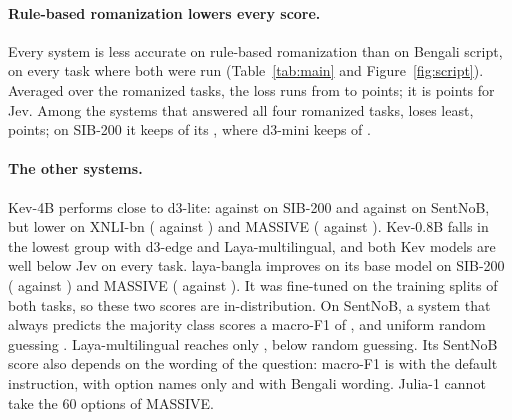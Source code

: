 \documentclass[11pt]{article}
\begin{document}
\paragraph{Rule-based romanization lowers every score.}
Every system is less accurate on rule-based romanization than on Bengali script, on every task where both were run (Table~\ref{tab:main} and Figure~\ref{fig:script}).
Averaged over the romanized tasks, the loss runs from \dropMinVal{} to \dropMaxVal{} points; it is \dropjev{} points for Jev.
Among the systems that answered all four romanized tasks, \dropBestName{} loses least, \dropBestVal{} points; on SIB-200 it keeps \accgemmaSibRom{} of its \accgemmaSibNat, where d3-mini keeps \accminiSibRom{} of \accminiSibNat.

\paragraph{The other systems.}
Kev-4B performs close to d3-lite: \acckevmdSibNat{} against \accliteSibNat{} on SIB-200 and \acckevmdSentNat{} against \accliteSentNat{} on SentNoB, but lower on XNLI-bn (\acckevmdXnliNat{} against \accliteXnliNat) and MASSIVE (\acckevmdMasNat{} against \accliteMasNat).
Kev-0.8B falls in the lowest group with d3-edge and Laya-multilingual, and both Kev models are well below Jev on every task.
laya-bangla improves on its base model on SIB-200 (\acclayabnSibNat{} against \acclayamlSibNat) and MASSIVE (\acclayabnMasNat{} against \acclayamlMasNat). It was fine-tuned on the training splits of both tasks, so these two scores are in-distribution.
On SentNoB, a system that always predicts the majority class scores a macro-F1 of \sentMajorityFone, and uniform random guessing \sentUniformFone.
Laya-multilingual reaches only \acclayamlSentNat, below random guessing.
Its SentNoB score also depends on the wording of the question: macro-F1 is \layamlSentDefault{} with the default instruction, \layamlSentOpts{} with option names only and \layamlSentBn{} with Bengali wording.
Julia-1 cannot take the 60 options of MASSIVE.
\begin{table}[t]
\centering\footnotesize

\caption{RQ1. Score on Bengali script, and in brackets on rule-based romanization, rotation 0 (accuracy; SentNoB macro-F1). Belebele passages were not romanized. Julia-1 cannot take the 60 options of MASSIVE. $^\ddagger$laya-bangla was fine-tuned on this task's training split. Majority class: the share of the most frequent label (for SentNoB, the macro-F1 of always predicting it); Belebele's answer positions rotate, so it has none. Uniform random: one over the number of options (for SentNoB, the expected macro-F1 of random guessing). Intervals are in Table~\ref{tab:ci}.}
\label{tab:main}
\end{table}
\end{document}
